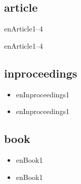 \documentclass[10pt, a4paper]{jsarticle}
\newcommand{\putlst}[1]{
  \noindent\makebox[\linewidth]{\rule{\linewidth}{0.4pt}}\vspace{-1.5zw}
  \vspace{-1.8zw}
  \noindent\makebox[\linewidth]{\rule{\linewidth}{0.4pt}}\vspace{0.5zw}\par
}
\begin{document}
\subsection{article}

\putlst{bib/enarticle.bib}

\begin{bibunit}[IEEJtran]
  enArticle1--4\cite{enArticle1,enArticle2,enArticle3,enArticle4}
  {\small {}}
\end{bibunit}
\begin{bibunit}[jIEEEtran]
  enArticle1--4\cite{enArticle1,enArticle2,enArticle3,enArticle4}
  {\small {}}
\end{bibunit}


\subsection{inproceedings}

\putlst{bib/eninproceedings.bib}

\begin{bibunit}[IEEJtran]
  \begin{itemize}
    \item enInproceedings1 \cite{enInproceedings1}
  \end{itemize}
  {\small {}}
\end{bibunit}
\begin{bibunit}[jIEEEtran]
  \begin{itemize}
    \item enInproceedings1 \cite{enInproceedings1}
  \end{itemize}
  {\small {}}
\end{bibunit}


\subsection{book}

\putlst{bib/enbook.bib}

\begin{bibunit}[IEEJtran]
  \begin{itemize}
    \item enBook1 \cite{enBook1}
  \end{itemize}
  {\small {}}
\end{bibunit}
\begin{bibunit}[jIEEEtran]
  \begin{itemize}
    \item enBook1 \cite{enBook1}
  \end{itemize}
  {\small {}}
\end{bibunit}
\end{document}
